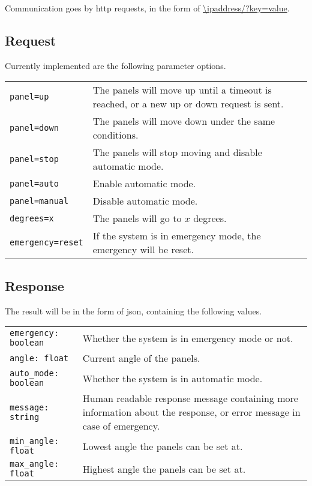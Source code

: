 

Communication goes by http requests, in the form of \url{\ipaddress/?key=value}.

\subsection{Request}
Currently implemented are the following parameter options.

\begin{tabular}{ll}
    \verb|panel=up| & The panels will move up until a timeout is reached, or
    a new up or down request is sent. \\
    \verb|panel=down| & The panels will move down under the same conditions. \\
    \verb|panel=stop| & The panels will stop moving and disable automatic mode. \\
    \verb|panel=auto| & Enable automatic mode. \\
    \verb|panel=manual| & Disable automatic mode. \\
    \verb|degrees=x| & The panels will go to $x$ degrees. \\
    \verb|emergency=reset| & If the system is in emergency mode, the emergency will be reset. \\
\end{tabular}

\subsection{Response}

The result will be in the form of json, containing the following values.

\begin{tabular}{ll}
    \verb|emergency: boolean| & Whether the system is in emergency mode or not. \\
    \verb|angle: float| & Current angle of the panels. \\
    \verb|auto_mode: boolean| & Whether the system is in automatic mode. \\
    \verb|message: string| & Human readable response message containing more information about the response, or error message in case of emergency. \\
    \verb|min_angle: float| & Lowest angle the panels can be set at. \\
    \verb|max_angle: float| & Highest angle the panels can be set at. \\
\end{tabular}


